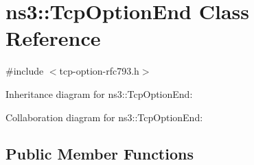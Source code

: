 \hypertarget{classns3_1_1TcpOptionEnd}{}\section{ns3\+:\+:Tcp\+Option\+End Class Reference}
\label{classns3_1_1TcpOptionEnd}


{\ttfamily \#include $<$tcp-\/option-\/rfc793.\+h$>$}



Inheritance diagram for ns3\+:\+:Tcp\+Option\+End\+:


Collaboration diagram for ns3\+:\+:Tcp\+Option\+End\+:
\subsection*{Public Member Functions}
